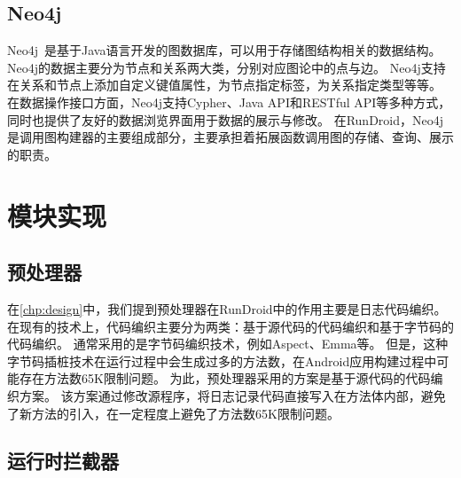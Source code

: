 \subsection{Neo4j}

Neo4j~\cite{Neo4jthe19}是基于Java语言开发的图数据库，可以用于存储图结构相关的数据结构。
Neo4j的数据主要分为节点和关系两大类，分别对应图论中的点与边。
Neo4j支持在关系和节点上添加自定义键值属性，为节点指定标签，为关系指定类型等等。
在数据操作接口方面，Neo4j支持Cypher、Java API和RESTful API等多种方式，同时也提供了友好的数据浏览界面用于数据的展示与修改。
在RunDroid，Neo4j是调用图构建器的主要组成部分，主要承担着拓展函数调用图的存储、查询、展示的职责。


\section{模块实现}



\subsection{预处理器}

在\autoref{chp:design}中，我们提到预处理器在RunDroid中的作用主要是日志代码编织。
在现有的技术上，代码编织主要分为两类：基于源代码的代码编织和基于字节码的代码编织。
通常采用的是字节码编织技术，例如Aspect、Emma等。
但是，这种字节码插桩技术在运行过程中会生成过多的方法数，在Android应用构建过程中可能存在方法数65K限制问题。
为此，预处理器采用的方案是基于源代码的代码编织方案。
该方案通过修改源程序，将日志记录代码直接写入在方法体内部，避免了新方法的引入，在一定程度上避免了方法数65K限制问题。



\subsection{运行时拦截器}%

